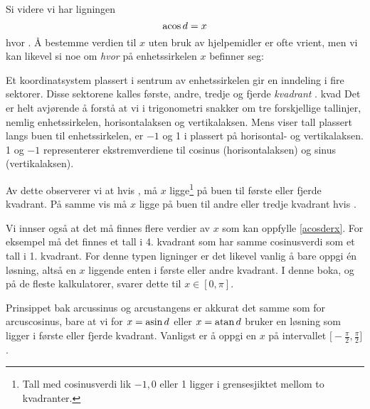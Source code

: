 Si videre vi har ligningen
\begin{equation}\label{acosderx}
\operatorname{acos} d=x 
\end{equation}
hvor . Å bestemme verdien til $ x $ uten bruk av hjelpemidler er ofte vrient, men vi kan likevel si noe om \textsl{hvor} på enhetssirkelen $ x $ befinner seg:\vsk

Et koordinatsystem plassert i sentrum av enhetssirkelen gir en inndeling i fire sektorer. Disse sektorene kalles første, andre, tredje og fjerde \textit{kvadrant} .\vs
{kvad}
Det er helt avjørende å forstå at vi i trigonometri snakker om tre forskjellige tallinjer, nemlig enhetssirkelen, horisontalaksen og vertikalaksen. Mens  viser tall plassert langs buen til enhetssirkelen, er $ -1 $ og 1 i  plassert på horisontal- og vertikalaksen. 1 og $ -1 $ representerer ekstremverdiene til cosinus (horisontalaksen) og sinus (vertikalaksen).\vsk

Av dette observerer vi at hvis , må $ x $ ligge\footnote{Tall med cosinusverdi lik $ -1, 0 $ eller 1 ligger i grensesjiktet mellom to kvadranter.} på buen til første eller fjerde kvadrant. På samme vis må $ x $ ligge på buen til andre eller tredje kvadrant hvis . \vsk

Vi innser også at det må finnes flere verdier av $ x $ som kan oppfylle \eqref{acosderx}. For eksempel må det finnes et tall i 4. kvadrant som har samme cosinusverdi som et tall i 1. kvadrant. 
For denne typen ligninger er det likevel vanlig å bare oppgi én løsning, altså en $ x $ liggende enten i første eller andre kvadrant. I denne boka, og på de fleste kalkulatorer, svarer dette til $ {x\in [0, \pi] }$.\vsk

Prinsippet bak arcussinus og arcustangens er akkurat det samme som for arcuscosinus, bare at vi for $ {x=\operatorname{asin} d}$ eller $ {x=\operatorname{atan} d }$ bruker en løsning som ligger i første eller fjerde kvadrant. Vanligst er å oppgi en $ x $ på intervallet $ {\Big[-\frac{\pi}{2}, \frac{\pi}{2}\Big]} $.
\newpage
{}
